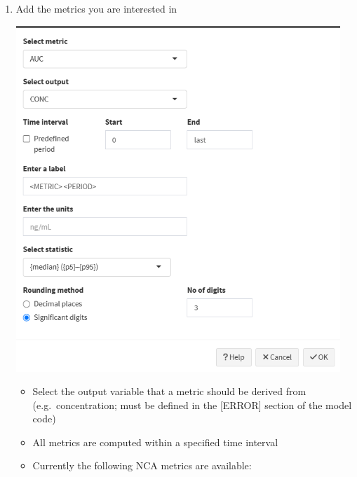 \documentclass[
]{book}
\begin{document}
\begin{enumerate}
\def\labelenumi{\arabic{enumi}.}
\item
  Add the metrics you are interested in

  \includegraphics[width=4.8125in,height=\textheight]{pictures/post_processing_new1.png}

  \begin{itemize}
  \item
    Select the output variable that a metric should be derived from (e.g.~concentration; must be defined in the {[}ERROR{]} section of the model code)
  \item
    All metrics are computed within a specified time interval
  \item
    Currently the following NCA metrics are available:


\end{itemize}
\end{enumerate}
\end{document}
